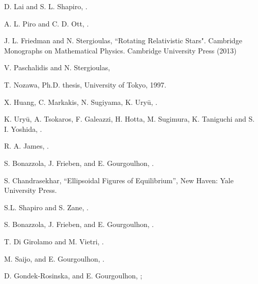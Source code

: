 D. Lai and S. L. Shapiro, .

A. L. Piro and C. D. Ott, .

J. L. Friedman and N. Stergioulas, ``Rotating Relativistic Stars". 
Cambridge Monographs on Mathematical Physics. Cambridge University Press (2013)

V. Paschalidis and N. Stergioulas, 

T. Nozawa, Ph.D. thesis, University of Tokyo, 1997.

X. Huang, C. Markakis, N. Sugiyama, K. Ury\=u, .

K. Ury\=u, A. Tsokaros, F. Galeazzi, H. Hotta, M. Sugimura, K. Taniguchi and S. I. Yoshida, .

R. A. James, .

S. Bonazzola, J. Frieben, and E. Gourgoulhon,  .

S. Chandrasekhar, ``Ellipsoidal Figures of Equilibrium'',  New Haven: Yale University Press.

S.L. Shapiro and S. Zane, .

S. Bonazzola, J. Frieben, and E. Gourgoulhon,  .

T. Di Girolamo and M. Vietri, .

M. Saijo, and E. Gourgoulhon, .

D. Gondek-Rosinska, and E. Gourgoulhon,  ; 

